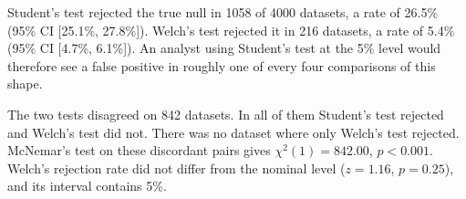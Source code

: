 Student's test rejected the true null in 1058 of 4000 datasets, a rate of 26.5\% (95\% CI [25.1\%, 27.8\%]). Welch's test rejected it in 216 datasets, a rate of 5.4\% (95\% CI [4.7\%, 6.1\%]). An analyst using Student's test at the 5\% level would therefore see a false positive in roughly one of every four comparisons of this shape.

The two tests disagreed on 842 datasets. In all of them Student's test rejected and Welch's test did not. There was no dataset where only Welch's test rejected. McNemar's test on these discordant pairs gives $\chi^2(1) = 842.00$, $p < 0.001$. Welch's rejection rate did not differ from the nominal level ($z = 1.16$, $p = 0.25$), and its interval contains 5\%.
